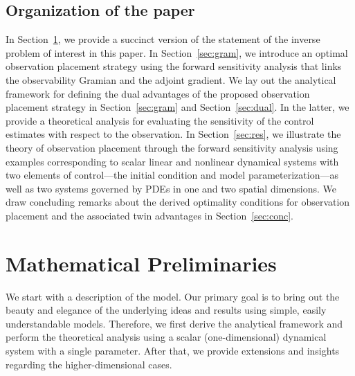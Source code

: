 \documentclass{article}
\begin{document}
\subsection{Organization of the paper}
In Section~\ref{sec:math}, we provide a succinct version of the statement of the inverse problem of interest in this paper. In Section~\ref{sec:gram}, we introduce an optimal observation placement strategy using the forward sensitivity analysis that links the observability Gramian and the adjoint gradient. We lay out the analytical framework for defining the dual advantages of the proposed observation placement strategy in Section~\ref{sec:gram} and Section~\ref{sec:dual}. In the latter, we provide a theoretical analysis for evaluating the sensitivity of the control estimates with respect to the observation. In Section~\ref{sec:res}, we illustrate the theory of observation placement through the forward sensitivity analysis using examples corresponding to scalar linear and nonlinear dynamical systems with two elements of control---the initial condition and model parameterization---\textcolor{rev}{as well as two systems governed by PDEs in one and two spatial dimensions}. We draw concluding remarks about the derived optimality conditions for observation placement and the associated twin advantages in Section~\ref{sec:conc}.



\section{Mathematical Preliminaries} \label{sec:math}
We start with a description of the model. Our primary goal is to bring out the beauty and elegance of the underlying ideas and results using simple, easily understandable models. \textcolor{rev}{Therefore, we first derive the analytical framework and perform the theoretical analysis using a scalar (one-dimensional) dynamical system with a single parameter. After that, we provide extensions and insights regarding the higher-dimensional cases.}

\end{document}
